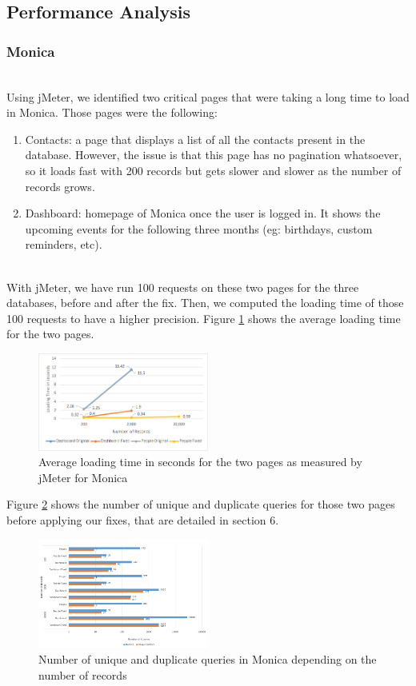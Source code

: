 \documentclass[sigconf]{acmart}
\begin{document}
\subsection{Performance Analysis}
\subsubsection{Monica}~\\
Using jMeter, we identified two critical pages that were taking a long time to load in Monica. Those pages were the following:
\begin{enumerate}
\item Contacts: a page that displays a list of all the contacts present in the  database. However, the issue is that this page has no pagination whatsoever, so it loads fast with 200 records but gets slower and slower as the number of records grows.
\item Dashboard: homepage of Monica once the user is logged in. It shows the upcoming events for the following three months (eg: birthdays, custom reminders, etc).
\end{enumerate}
\ \\With jMeter, we have run 100 requests on these two pages for the three databases, before and after the fix. Then, we computed the loading time of those 100 requests to have a higher precision. Figure \ref{loadingtimemonica} shows the average loading time for the two pages.
\begin{figure}[b!]
\includegraphics[width=0.5\textwidth]{loadingtimemonica}
\caption{Average loading time in seconds for the two pages as measured by jMeter for Monica}
\label{loadingtimemonica}
\end{figure}
Figure \ref{monicaqueries} shows the number of unique and duplicate queries for those two pages before applying our fixes, that are detailed in section 6. 
\begin{figure}[t!]
\includegraphics[width=0.5\textwidth]{monicaqueries}
\caption{Number of unique and duplicate queries in Monica depending on the number of records}
\label{monicaqueries}
\end{figure}
\end{document}
